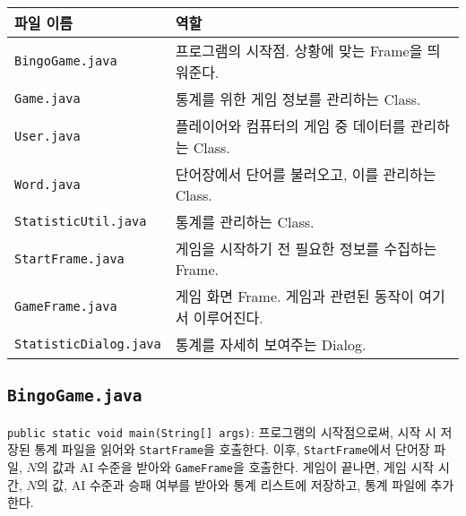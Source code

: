 \begin{tabularx}{\textwidth}{l|X}
    \hline
    파일 이름                         & 역할                                  \\
    \hline
    \texttt{BingoGame.java}       & 프로그램의 시작점. 상황에 맞는 Frame을 띄워준다.      \\
    \hline
    \texttt{Game.java}            & 통계를 위한 게임 정보를 관리하는 Class.           \\
    \texttt{User.java}            & 플레이어와 컴퓨터의 게임 중 데이터를 관리하는 Class.    \\
    \texttt{Word.java}            & 단어장에서 단어를 불러오고, 이를 관리하는 Class.      \\
    \hline
    \texttt{StatisticUtil.java}   & 통계를 관리하는 Class.                     \\
    \hline
    \texttt{StartFrame.java}      & 게임을 시작하기 전 필요한 정보를 수집하는 Frame.      \\
    \texttt{GameFrame.java}       & 게임 화면 Frame. 게임과 관련된 동작이 여기서 이루어진다. \\
    \texttt{StatisticDialog.java} & 통계를 자세히 보여주는 Dialog.                \\
    \hline
\end{tabularx}

\subsection{\texttt{BingoGame.java}}
\texttt{public static void main(String[] args)}:
프로그램의 시작점으로써,
시작 시 저장된 통계 파일을 읽어와 \texttt{StartFrame}을 호출한다.
이후, \texttt{StartFrame}에서 단어장 파일, $N$의 값과 AI 수준을 받아와 \texttt{GameFrame}을 호출한다.
게임이 끝나면, 게임 시작 시간, $N$의 값, AI 수준과 승패 여부를 받아와 통계 리스트에 저장하고, 통계 파일에 추가한다.




